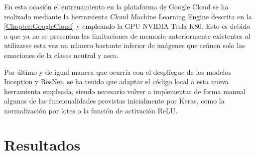 En esta ocasión el entrenamiento en la plataforma de Google Cloud se ha realizado mediante la herramienta Cloud Machine Learning Engine descrita en la \autoref{Chapter:GoogleCloud} y empleando la GPU NVIDIA Tesla K80. Esto es debido a que ya no se presentan las limitaciones de memoria anteriormente existentes al utilizarse esta vez un número bastante inferior de imágenes que reúnen solo las emociones de la clases neutral y asco.

Por último y de igual manera que ocurría con el despliegue de los modelos Inception y ResNet, se ha tenido que adaptar el código local a esta nueva herramienta empleada, siendo necesario volver a implementar de forma manual algunas de las funcionalidades provistas inicialmente por Keras, como la normalización por lotes o la función de activación ReLU.

\section{Resultados}